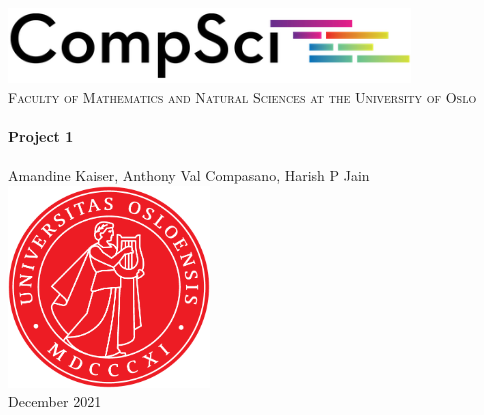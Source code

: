 \begin{titlepage}
    \vbox{ }

    \vbox{ }

    \begin{center}
        \includegraphics[width=0.8\textwidth]{Images/compsci_logo.png}\\[2cm]
        \textsc{\Large Faculty of Mathematics and Natural Sciences at the University of Oslo}\\[0.7cm]
        \noindent\makebox[\linewidth]{\rule{.7\paperwidth}{.6pt}}\\[0.7cm]
        { \huge \bfseries Project 1}\\[0.25cm]
        \noindent\makebox[\linewidth]{\rule{.7\paperwidth}{.6pt}}\\[0.7cm]
        \large{Amandine Kaiser, Anthony Val Compasano, Harish P Jain}\\[2cm]
        \includegraphics[width=0.4\textwidth]{Images/UiO_logo.png}\\
        \vfill
        {\large December 2021}
    \end{center}
\end{titlepage}